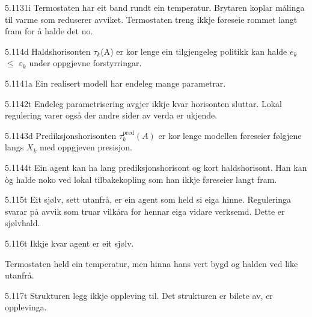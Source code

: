 \begin{formproposition}{5.1131}{i}
Termostaten har eit band rundt ein temperatur. Brytaren koplar målinga til varme som reduserer avviket. Termostaten treng ikkje føreseie rommet langt fram for å halde det no.
\end{formproposition}

\begin{formproposition}{5.114}{d}
Haldshorisonten \(τ_{k}\)(A) er kor lenge ein tilgjengeleg politikk kan halde \(e_{k}\) \(≤\) \(ε_{k}\) under oppgjevne forstyrringar.
\end{formproposition}

\begin{formproposition}{5.1141}{a}
Ein realisert modell har endeleg mange parametrar.
\end{formproposition}

\begin{formproposition}{5.1142}{t}
Endeleg parametrisering avgjer ikkje kvar horisonten sluttar. Lokal regulering varer også der andre sider av verda er ukjende.
\end{formproposition}

\begin{formproposition}{5.1143}{d}
Prediksjonshorisonten \(\tau^{\mathrm{pred}}_k(A)\) er kor lenge modellen føreseier følgjene langs \(X_k\) med oppgjeven presisjon.
\end{formproposition}

\begin{formproposition}{5.1144}{t}
Ein agent kan ha lang prediksjonshorisont og kort haldshorisont. Han kan òg halde noko ved lokal tilbakekopling som han ikkje føreseier langt fram.
\end{formproposition}

\begin{formproposition}{5.115}{t}
Eit sjølv, sett utanfrå, er ein agent som held si eiga hinne. Reguleringa svarar på avvik som truar vilkåra for hennar eiga vidare verksemd. Dette er sjølvhald.
\end{formproposition}

\begin{formproposition}{5.116}{t}
Ikkje kvar agent er eit sjølv.

Termostaten held ein temperatur, men hinna hans vert bygd og halden ved like utanfrå.
\end{formproposition}

\begin{formproposition}{5.117}{t}
Strukturen legg ikkje oppleving til. Det strukturen er bilete av, er opplevinga.
\end{formproposition}


